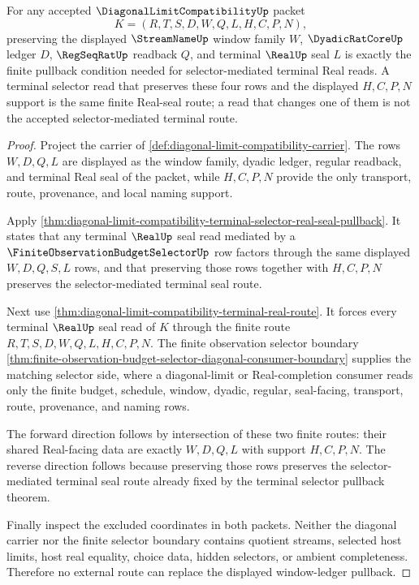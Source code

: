 \begin{theorem}
\label{thm:diagonal-limit-compatibility-window-ledger-pullback}
For any accepted $\DiagonalLimitCompatibilityUp$ packet
$$
K=(R,T,S,D,W,Q,L,H,C,P,N),
$$
preserving the displayed $\StreamNameUp$ window family $W$, $\DyadicRatCoreUp$ ledger $D$, $\RegSeqRatUp$ readback $Q$, and terminal $\RealUp$ seal $L$ is exactly the finite pullback condition needed for selector-mediated terminal Real reads. A terminal selector read that preserves these four rows and the displayed $H,C,P,N$ support is the same finite Real-seal route; a read that changes one of them is not the accepted selector-mediated terminal route.
\end{theorem}
\begin{proof}
Project the carrier of \autoref{def:diagonal-limit-compatibility-carrier}. The rows $W,D,Q,L$ are displayed as the window family, dyadic ledger, regular readback, and terminal Real seal of the packet, while $H,C,P,N$ provide the only transport, route, provenance, and local naming support.

Apply \autoref{thm:diagonal-limit-compatibility-terminal-selector-real-seal-pullback}. It states that any terminal $\RealUp$ seal read mediated by a $\FiniteObservationBudgetSelectorUp$ row factors through the same displayed $W,D,Q,S,L$ rows, and that preserving those rows together with $H,C,P,N$ preserves the selector-mediated terminal seal route.

Next use \autoref{thm:diagonal-limit-compatibility-terminal-real-route}. It forces every terminal $\RealUp$ seal read of $K$ through the finite route $R,T,S,D,W,Q,L,H,C,P,N$. The finite observation selector boundary \autoref{thm:finite-observation-budget-selector-diagonal-consumer-boundary} supplies the matching selector side, where a diagonal-limit or Real-completion consumer reads only the finite budget, schedule, window, dyadic, regular, seal-facing, transport, route, provenance, and naming rows.

The forward direction follows by intersection of these two finite routes: their shared Real-facing data are exactly $W,D,Q,L$ with support $H,C,P,N$. The reverse direction follows because preserving those rows preserves the selector-mediated terminal seal route already fixed by the terminal selector pullback theorem.

Finally inspect the excluded coordinates in both packets. Neither the diagonal carrier nor the finite selector boundary contains quotient streams, selected host limits, host real equality, choice data, hidden selectors, or ambient completeness. Therefore no external route can replace the displayed window-ledger pullback.
\end{proof}
